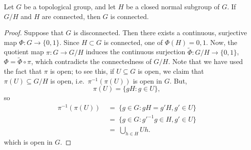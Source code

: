 \documentclass[11pt]{article}
\theoremstyle{definition}
\theoremstyle{remark}
\numberwithin{equation}{section}
\begin{document}
    \begin{theorem}
        Let $G$ be a topological group, and let $H$ be a closed normal subgroup of
        $G$. If $G/H$ and $H$ are connected, then $G$ is connected.
    \end{theorem}
    \begin{proof}
        Suppose that $G$ is disconnected. Then there exists a continuous, surjective
        map $\Phi\colon G \to \{0, 1\}$. Since $H \subset G$ is connected, one of
        $\Phi(H) = 0, 1$. Now, the quotient map $\pi\colon G \to G/H$ induces the
        continuous surjection $\tilde{\Phi}\colon G/H \to \{0, 1\}$, $\Phi =
        \tilde{\Phi} \circ \pi$, which contradicts the connectedness of $G/H$. Note
        that we have used the fact that $\pi$ is open; to see this, if $U\subseteq G$
        is open, we claim that $\pi(U) \subseteq G/H$ is open, i.e.\
        $\pi^{-1}(\pi(U))$ is open in $G$. But, \[
            \pi(U) = \{gH : g \in U\},
        \] so \begin{align*}
            \pi^{-1}(\pi(U)) \;&=\; \{g \in G: gH = g'H, g' \in U\} \\
            \;&=\; \{g \in G : g'^{-1}g \in H, g' \in U\} \\
            \;&=\; \bigcup_{h \in H} Uh.
        \end{align*}
        which is open in $G$.
    \end{proof}
\end{document}

